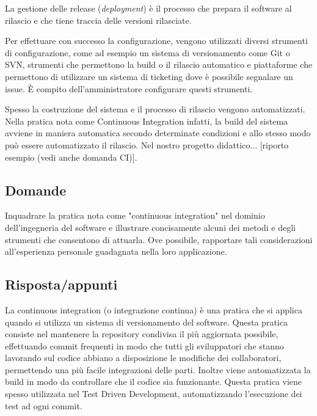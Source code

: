 La gestione delle release (\textit{deployment}) è il processo che prepara il software al rilascio e che tiene traccia delle versioni rilasciate. 

Per effettuare con successo la configurazione, vengono utilizzati diversi strumenti di configurazione, come ad esempio un sistema di versionamento come Git o SVN, strumenti che permettono la build o il rilascio automatico e piattaforme che permettono di utilizzare un sistema di ticketing dove è possibile segnalare un issue. \`E compito dell'amministratore configurare questi strumenti.

Spesso la costruzione del sistema e il processo di rilascio vengono automatizzati. Nella pratica nota come Continuous Integration infatti, la build del sistema avviene in maniera automatica secondo determinate condizioni e allo stesso modo può essere automatizzato il rilascio. Nel nostro progetto didattico... [riporto esempio (vedi anche domanda CI)].











\subsection*{Domande} %
Inquadrare la pratica nota come "continuous integration" nel dominio dell'ingegneria del software e illustrare concisamente alcuni dei metodi e degli strumenti che consentono di attuarla. Ove possibile, rapportare tali considerazioni all'esperienza personale guadagnata nella loro applicazione.

\subsection*{Risposta/appunti} %
La continuous integration (o integrazione continua) è una pratica che si applica quando si utilizza un sistema di versionamento del software. Questa pratica consiste nel mantenere la repository condivisa il più aggiornata possibile, effettuando commit frequenti in modo che tutti gli sviluppatori che stanno lavorando sul codice abbiano a disposizione le modifiche dei collaboratori, permettendo una più facile integrazioni delle parti. Inoltre viene automatizzata la build in modo da controllare che il codice sia funzionante. Questa pratica viene spesso utilizzata nel Test Driven Development, automatizzando l'esecuzione dei test ad ogni commit.

